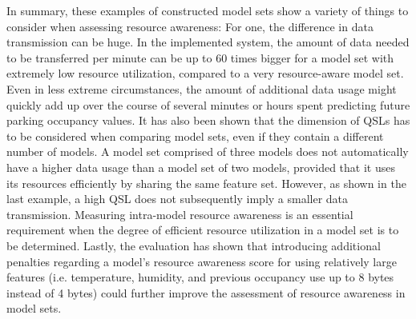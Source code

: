 In summary, these examples of constructed model sets show a variety of things to consider when assessing resource awareness: For one, the difference in data transmission can be huge. In the implemented system, the amount of data needed to be transferred per minute can be up to 60 times bigger for a model set with extremely low resource utilization, compared to a very resource-aware model set. Even in less extreme circumstances, the amount of additional data usage might quickly add up over the course of several minutes or hours spent predicting future parking occupancy values. It has also been shown that the dimension of QSLs has to be considered when comparing model sets, even if they contain a different number of models. A model set comprised of three models does not automatically have a higher data usage than a model set of two models, provided that it uses its resources efficiently by sharing the same feature set. However, as shown in the last example, a high QSL does not subsequently imply a smaller data transmission. Measuring intra-model resource awareness is an essential requirement when the degree of efficient resource utilization in a model set is to be determined. Lastly, the evaluation has shown that introducing additional penalties regarding a model's resource awareness score for using relatively large features (i.e. temperature, humidity, and previous occupancy use up to 8 bytes instead of 4 bytes) could further improve the assessment of resource awareness in model sets. 
